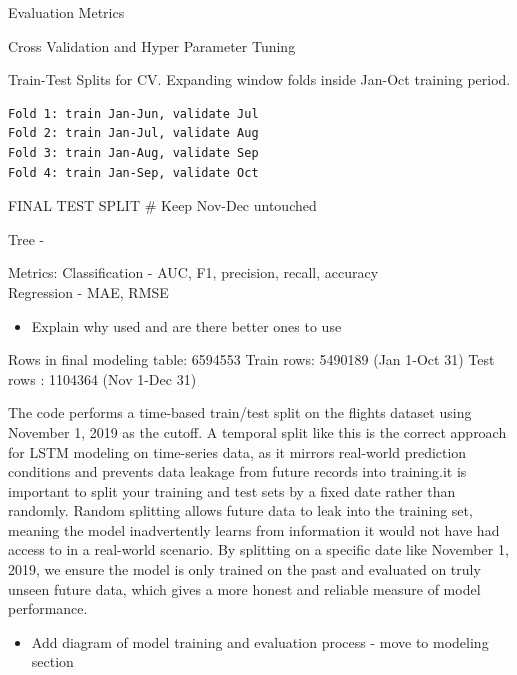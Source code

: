 \documentclass[
  letterpaper,
  DIV=11,
  numbers=noendperiod]{scrartcl}
\providecommand{\tightlist}{%
  \setlength{\itemsep}{0pt}\setlength{\parskip}{0pt}}
\begin{document}
Evaluation Metrics

Cross Validation and Hyper Parameter Tuning

Train-Test Splits for CV. Expanding window folds inside Jan-Oct training
period.

\begin{verbatim}
Fold 1: train Jan-Jun, validate Jul
Fold 2: train Jan-Jul, validate Aug
Fold 3: train Jan-Aug, validate Sep
Fold 4: train Jan-Sep, validate Oct
\end{verbatim}

FINAL TEST SPLIT \# Keep Nov-Dec untouched

Tree -

Metrics: Classification - AUC, F1, precision, recall, accuracy\\
Regression - MAE, RMSE

\begin{itemize}
\tightlist
\item
  Explain why used and are there better ones to use
\end{itemize}

Rows in final modeling table: 6594553 Train rows: 5490189 (Jan 1-Oct 31)
Test rows : 1104364 (Nov 1-Dec 31)

The code performs a time-based train/test split on the flights dataset
using November 1, 2019 as the cutoff. A temporal split like this is the
correct approach for LSTM modeling on time-series data, as it mirrors
real-world prediction conditions and prevents data leakage from future
records into training.it is important to split your training and test
sets by a fixed date rather than randomly. Random splitting allows
future data to leak into the training set, meaning the model
inadvertently learns from information it would not have had access to in
a real-world scenario. By splitting on a specific date like November 1,
2019, we ensure the model is only trained on the past and evaluated on
truly unseen future data, which gives a more honest and reliable measure
of model performance.

\begin{itemize}
\tightlist
\item
  Add diagram of model training and evaluation process - move to
  modeling section
\end{itemize}
\end{document}
